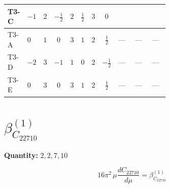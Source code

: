 \documentclass[8pt]{article}
\begin{document}
\begin{landscape}
\begin{longtable}{@{}llcccccc >{\raggedright\arraybackslash}p{0.21\linewidth} >{\raggedright\arraybackslash}p{0.21\linewidth} >{\raggedright\arraybackslash}p{0.21\linewidth}@{}}
T3-C & $-1$ & $2$ & $-\frac{1}{2}$ & $2$ & $\frac{1}{2}$ & $3$ & $0$ & \scriptsize\adjustbox{max width=\linewidth}{$\begin{gathered} - \frac{lambda12Inv2 \overline{y_{1}} \overline{y_{2}}}{3 MF}\end{gathered}$} & \scriptsize\adjustbox{max width=\linewidth}{$\begin{gathered} - \frac{\sqrt{3} g_{2}^{2} \overline{y_{1}} \overline{y_{2}}}{4 MF}\end{gathered}$} & \scriptsize\adjustbox{max width=\linewidth}{$\begin{gathered} \frac{\sqrt{3} ye \overline{y_{1}} \overline{y_{2}} \overline{ye}}{12 MF}\end{gathered}$} \\
\midrule
T3-A & $0$ & $1$ & $0$ & $3$ & $1$ & $2$ & $\frac{1}{2}$ & --- & --- & --- \\
\midrule
T3-D & $-2$ & $3$ & $-1$ & $1$ & $0$ & $2$ & $-\frac{1}{2}$ & --- & --- & --- \\
\midrule
T3-E & $0$ & $3$ & $0$ & $3$ & $1$ & $2$ & $\frac{1}{2}$ & --- & --- & --- \\
\midrule
\bottomrule
\end{longtable}
\clearpage
\section*{$\beta_{C_{22710}}^{(1)}$}
\noindent\textbf{Quantity: }$\mathrm{2,2,7,10}$\par\smallskip
\[16\pi^2\,\mu\frac{d C_{22710}}{d\mu}=\beta_{C_{22710}}^{(1)}\]

\end{landscape}
\end{document}
